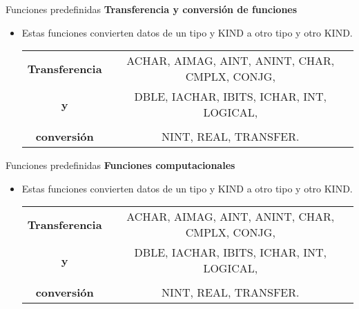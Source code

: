 \begin{frame}[fragile]{Funciones predefinidas}
 \textbf{Transferencia y conversión de funciones}
 \begin{itemize}[<+(1)->]
  \item Estas funciones convierten datos de un tipo y KIND a otro tipo y otro KIND.
   \begin{table}[]
    \centering
    \label{Tabla_funciones_predefinidas}
    \resizebox{9cm}{!} {
      \begin{tabular}{|c|c|}
        \hline
        \textbf{Transferencia}  & ACHAR, AIMAG, AINT, ANINT, CHAR, CMPLX, CONJG,\\        
        \textbf{y}              & DBLE, IACHAR, IBITS, ICHAR, INT, LOGICAL,\\                                  \\
        \textbf{conversión}     & NINT, REAL, TRANSFER.                                                 \\ \hline
      \end{tabular}}
    \end{table}
 \end{itemize}
\end{frame}

\begin{frame}[fragile]{Funciones predefinidas}
 \textbf{Funciones computacionales}
 \begin{itemize}[<+(1)->]
  \item Estas funciones convierten datos de un tipo y KIND a otro tipo y otro KIND.
   \begin{table}[]
    \centering
    \label{Tabla_funciones_predefinidas}
    \resizebox{9cm}{!} {
      \begin{tabular}{|c|c|}
        \hline
        \textbf{Transferencia}  & ACHAR, AIMAG, AINT, ANINT, CHAR, CMPLX, CONJG,\\        
        \textbf{y}              & DBLE, IACHAR, IBITS, ICHAR, INT, LOGICAL,\\                                  \\
        \textbf{conversión}     & NINT, REAL, TRANSFER.                                                 \\ \hline
      \end{tabular}}
    \end{table}
 \end{itemize}
\end{frame}